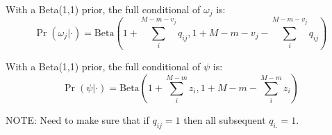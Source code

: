 \documentclass[12pt]{article}
\begin{document}
With a Beta(1,1) prior, the full conditional of $\omega_j$ is:
\[
\Pr(\omega_j|\cdot) = \text{Beta}(1+\sum_i^{M-m-v_j} q_{ij}, 1+M-m-v_j-\sum_i^{M-m-v_j}q_{ij})
\]

With a Beta(1,1) prior, the full conditional of $\psi$ is:
\[
\Pr(\psi|\cdot) = \text{Beta}(1+\sum_i^{M-m} z_{i}, 1+M-m-\sum_i^{M-m}z_i)
\]

NOTE: Need to make sure that if $q_{ij}=1$ then all subsequent
$q_{i.}=1$.
\end{document}

